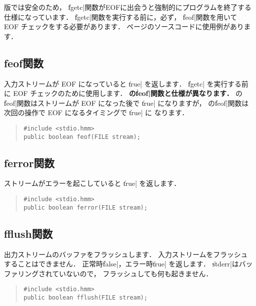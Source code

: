 {\tacos}版では安全のため，
\|fgetc|関数がEOFに出会うと強制的にプログラムを終了する仕様になっています．
\|fgetc|関数を実行する前に，必ず，
\|feof|関数を用いて EOF チェックをする必要があります．
\pageref{chap4:cat1}ページのソースコードに使用例があります．

\subsection{feof関数}

入力ストリームが EOF になっていると \|true| を返します．
\|fgetc| を実行する前に EOF チェックのために使用します．
{\bf \cl の\|feof|関数と仕様が異なります．}
\cl の\|feof|関数はストリームが EOF になった後で \|true| になりますが，
\cmml の\|feof|関数は次回の操作で EOF になるタイミングで \|true| に
なります．

\begin{quote}
\begin{verbatim}
#include <stdio.hmm>
public boolean feof(FILE stream);
\end{verbatim}
\end{quote}

\subsection{ferror関数}

ストリームがエラーを起こしていると \|true| を返します．

\begin{quote}
\begin{verbatim}
#include <stdio.hmm>
public boolean ferror(FILE stream);
\end{verbatim}
\end{quote}

\subsection{fflush関数}

出力ストリームのバッファをフラッシュします．
入力ストリームをフラッシュすることはできません．
正常時\|false|，エラー時\|true| を返します．
\|stderr|はバッファリングされていないので，
フラッシュしても何も起きません．

\begin{quote}
\begin{verbatim}
#include <stdio.hmm>
public boolean fflush(FILE stream);
\end{verbatim}
\end{quote}

